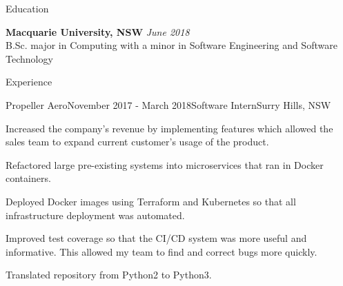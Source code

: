 \documentclass{resume} %
\begin{document}

\begin{rSection}{Education}

{\bf Macquarie University, NSW} \hfill {\em June 2018} \\ 
B.Sc. major in Computing with a minor in Software Engineering and Software Technology\\

\end{rSection}


\begin{rSection}{Experience}

\begin{rSubsection}{Propeller Aero}{November 2017 - March 2018}{Software Intern}{Surry Hills, NSW}
\item Increased the company's revenue by implementing features which allowed the sales team to expand current customer's usage of the product.
\item Refactored large pre-existing systems into microservices that ran in Docker containers. 
\item Deployed Docker images using Terraform and Kubernetes so that all infrastructure deployment was automated.
\item Improved test coverage so that the CI/CD system was more useful and informative. This allowed my team to find and correct bugs more quickly.
\item Translated repository from Python2 to Python3.
\end{rSubsection}

\end{rSection}

\end{document}
